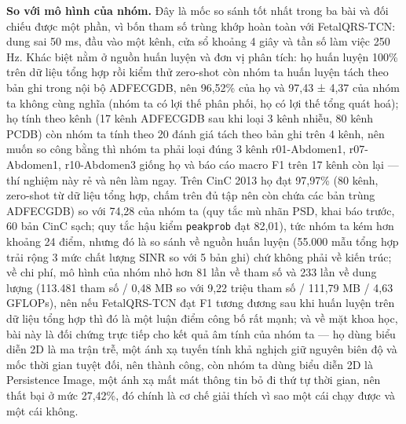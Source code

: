\documentclass[12pt,a4paper]{article}
\begin{document}
\noindent \textbf{\color{tdtblue}So với mô hình của nhóm.} Đây là mốc so sánh tốt nhất trong ba bài và đối chiếu được một phần, vì bốn tham số trùng khớp hoàn toàn với FetalQRS-TCN: dung sai 50 ms, đầu vào một kênh, cửa sổ khoảng 4 giây và tần số làm việc 250 Hz. Khác biệt nằm ở nguồn huấn luyện và đơn vị phân tích: họ huấn luyện 100\% trên dữ liệu tổng hợp rồi kiểm thử zero-shot còn nhóm ta huấn luyện tách theo bản ghi trong nội bộ ADFECGDB, nên 96,52\% của họ và 97,43 ± 4,37 của nhóm ta không cùng nghĩa (nhóm ta có lợi thế phân phối, họ có lợi thế tổng quát hoá); họ tính theo kênh (17 kênh ADFECGDB sau khi loại 3 kênh nhiễu, 80 kênh PCDB) còn nhóm ta tính theo 20 đánh giá tách theo bản ghi trên 4 kênh, nên muốn so công bằng thì nhóm ta phải loại đúng 3 kênh r01-Abdomen1, r07-Abdomen1, r10-Abdomen3 giống họ và báo cáo macro F1 trên 17 kênh còn lại — thí nghiệm này rẻ và nên làm ngay. Trên CinC 2013 họ đạt 97,97\% (80 kênh, zero-shot từ dữ liệu tổng hợp, chấm trên đủ tập nên còn chứa các bản trùng ADFECGDB) so với 74,28 của nhóm ta (quy tắc mù nhãn PSD, khai báo trước, 60 bản CinC sạch; quy tắc hậu kiểm \texttt{peakprob} đạt 82,01), tức nhóm ta kém hơn khoảng 24 điểm, nhưng đó là so sánh về nguồn huấn luyện (55.000 mẫu tổng hợp trải rộng 3 mức chất lượng SINR so với 5 bản ghi) chứ không phải về kiến trúc; về chi phí, mô hình của nhóm nhỏ hơn 81 lần về tham số và 233 lần về dung lượng (113.481 tham số / 0,48 MB so với 9,22 triệu tham số / 111,79 MB / 4,63 GFLOPs), nên nếu FetalQRS-TCN đạt F1 tương đương sau khi huấn luyện trên dữ liệu tổng hợp thì đó là một luận điểm công bố rất mạnh; và về mặt khoa học, bài này là đối chứng trực tiếp cho kết quả âm tính của nhóm ta — họ dùng biểu diễn 2D là ma trận trễ, một ánh xạ tuyến tính khả nghịch giữ nguyên biên độ và mốc thời gian tuyệt đối, nên thành công, còn nhóm ta dùng biểu diễn 2D là Persistence Image, một ánh xạ mất mát thông tin bỏ đi thứ tự thời gian, nên thất bại ở mức 27,42\%, đó chính là cơ chế giải thích vì sao một cái chạy được và một cái không.\par\vspace{3pt}
\end{document}
